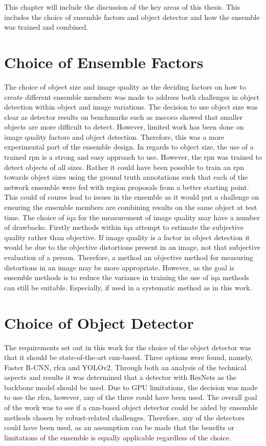 This chapter will include the discussion of the key areas of this thesis. This includes the choice of ensemble factors and object detector and how the ensemble was trained and combined.

\section{Choice of Ensemble Factors}
The choice of object size and image quality as the deciding factors on how to create different ensemble members was made to address both challenges in object detection within object and image variations. The decision to use object size was clear as detector results on benchmarks such as \gls{mscoco} showed that smaller objects are more difficult to detect. However, limited work has been done on image quality factors and object detection. Therefore, this was a more experimental part of the ensemble design. In regards to object size, the use of a trained \gls{rpn} is a strong and easy approach to use. However, the \gls{rpn} was trained to detect objects of all sizes. Rather it could have been possible to train an \gls{rpn} towards object sizes using the ground truth annotations such that each of the network ensemble were fed with region proposals from a better starting point. This could of course lead to issues in the ensemble as it would put a challenge on ensuring the ensemble members are combining results on the same object at test time. The choice of \gls{iqa} for the measurement of image quality may have a number of drawbacks. Firstly methods within \gls{iqa} attempt to estimate the subjective quality rather than objective. If image quality is a factor in object detection it would be due to the objective distortions present in an image, not that subjective evaluation of a person. Therefore, a method an objective method for measuring distortions in an image may be more appropriate. However, as the goal is ensemble methods is to reduce the variance in training the use of \gls{iqa} methods can still be suitable. Especially, if used in a systematic method as in this work.


\section{Choice of Object Detector}
The requirements set out in this work for the choice of the object detector was that it should be state-of-the-art \gls{cnn}-based. Three options were found, namely, Faster R-CNN, \gls{rfcn} and YOLOv2. Through both an analysis of the technical aspects and results it was determined that a detector with ResNets as the backbone model should be used. Due to GPU limitations, the decision was made to use the \gls{rfcn}, however, any of the three could have been used. The overall goal of the work was to see if a \gls{cnn}-based object detector could be aided by ensemble methods chosen by robust-related challenges. Therefore, any of the detectors could have been used, as an assumption can be made that the benefits or limitations of the ensemble is equally applicable regardless of the choice.

